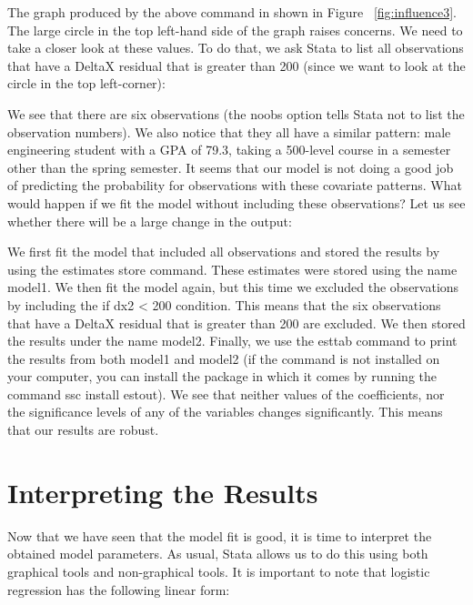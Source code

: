 \documentclass[a4paper,12pt,oneside]{book}
\begin{document}
The graph produced by the above command in shown in Figure ~\ref{fig:influence3}. The large circle in the top left-hand side of the graph raises concerns. We need to take a closer look at these values. To do that, 
we ask Stata to list all observations that have a DeltaX residual that is greater than 200 (since we want to look at the circle in the top left-corner):

\begin{stlog}\end{stlog}

We see that there are six observations (the noobs option tells Stata not to list the observation numbers). We also notice that they all have a similar pattern: male engineering student with a GPA of 79.3, taking a 500-level course in a 
semester other than the spring semester. It seems that our model is not doing a good job of predicting the probability for observations with these covariate patterns. 
What would happen if we fit the model without including these observations? Let us see whether there will be a large change in the output:

\begin{stlog}\end{stlog}

We first fit the model that included all observations and stored the results by using the estimates store command. These estimates were stored using the name model1. We then fit the model again, 
but this time we excluded the observations by including the if dx2 < 200 condition. This means that the six observations that have a DeltaX residual that is greater than 200 are excluded. We 
then stored the results under the name model2. Finally, we use the esttab command to print the results from both model1 and model2 (if the command is not installed on your computer, you can 
install the package in which it comes by running the command ssc install estout). We see that neither values of the coefficients, nor the significance levels of any of the variables changes significantly. 
This means that our results are robust.
\section{Interpreting the Results}
Now that we have seen that the model fit is good, it is time to interpret the obtained model parameters. As usual, Stata allows us to do this using both graphical tools and non-graphical tools. It 
is important to note that logistic regression has the following linear form:
\end{document}
